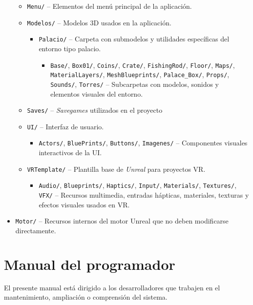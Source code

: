 \begin{itemize}
\begin{itemize}
\begin{itemize}
\begin{itemize}
      \end{itemize}
    \end{itemize}
    \item \texttt{Menu/} – Elementos del menú principal de la aplicación.
    \item \texttt{Modelos/} – Modelos 3D usados en la aplicación.
    \begin{itemize}
      \item \texttt{Palacio/} – Carpeta con submodelos y utilidades específicas del entorno tipo palacio.
      \begin{itemize}
        \item \texttt{Base/}, \texttt{Box01/}, \texttt{Coins/}, \texttt{Crate/}, \texttt{FishingRod/}, \texttt{Floor/}, \texttt{Maps/}, \texttt{MaterialLayers/}, \texttt{MeshBlueprints/}, \texttt{Palace\_Box/}, \texttt{Props/}, \texttt{Sounds/}, \texttt{Torres/} – Subcarpetas con modelos, sonidos y elementos visuales del entorno.
      \end{itemize}
    \end{itemize}
    \item \texttt{Saves/} – \textit{Savegames} utilizados en el proyecto
    \item \texttt{UI/} – Interfaz de usuario.
    \begin{itemize}
      \item \texttt{Actors/}, \texttt{BluePrints/}, \texttt{Buttons/}, \texttt{Imagenes/} – Componentes visuales interactivos de la UI.
    \end{itemize}
    \item \texttt{VRTemplate/} – Plantilla base de \textit{Unreal} para proyectos VR.
    \begin{itemize}
      \item \texttt{Audio/}, \texttt{Blueprints/}, \texttt{Haptics/}, \texttt{Input/}, \texttt{Materials/}, \texttt{Textures/}, \texttt{VFX/} – Recursos multimedia, entradas hápticas, materiales, texturas y efectos visuales usados en VR.
    \end{itemize}
  \end{itemize}
  \item \texttt{Motor/} – Recursos internos del motor Unreal que no deben modificarse directamente.
\end{itemize}
\section{Manual del programador}
El presente manual está dirigido a los desarrolladores que trabajen en el mantenimiento, ampliación o comprensión del sistema.
